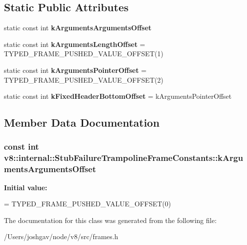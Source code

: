 \subsection*{Static Public Attributes}
\begin{DoxyCompactItemize}
\item 
static const int {\bfseries k\+Arguments\+Arguments\+Offset}
\item 
static const int {\bfseries k\+Arguments\+Length\+Offset} = T\+Y\+P\+E\+D\+\_\+\+F\+R\+A\+M\+E\+\_\+\+P\+U\+S\+H\+E\+D\+\_\+\+V\+A\+L\+U\+E\+\_\+\+O\+F\+F\+S\+ET(1)\hypertarget{classv8_1_1internal_1_1_stub_failure_trampoline_frame_constants_a8ff6afffeb210191e51c4a1f099601eb}{}\label{classv8_1_1internal_1_1_stub_failure_trampoline_frame_constants_a8ff6afffeb210191e51c4a1f099601eb}

\item 
static const int {\bfseries k\+Arguments\+Pointer\+Offset} = T\+Y\+P\+E\+D\+\_\+\+F\+R\+A\+M\+E\+\_\+\+P\+U\+S\+H\+E\+D\+\_\+\+V\+A\+L\+U\+E\+\_\+\+O\+F\+F\+S\+ET(2)\hypertarget{classv8_1_1internal_1_1_stub_failure_trampoline_frame_constants_a4a84da46fd7f1cb06a7f994f67da07d3}{}\label{classv8_1_1internal_1_1_stub_failure_trampoline_frame_constants_a4a84da46fd7f1cb06a7f994f67da07d3}

\item 
static const int {\bfseries k\+Fixed\+Header\+Bottom\+Offset} = k\+Arguments\+Pointer\+Offset\hypertarget{classv8_1_1internal_1_1_stub_failure_trampoline_frame_constants_a7ae9ee1715fc8c8cc52e0093fcd5f57e}{}\label{classv8_1_1internal_1_1_stub_failure_trampoline_frame_constants_a7ae9ee1715fc8c8cc52e0093fcd5f57e}

\end{DoxyCompactItemize}


\subsection{Member Data Documentation}
\subsubsection[{\texorpdfstring{k\+Arguments\+Arguments\+Offset}{kArgumentsArgumentsOffset}}]{\setlength{\rightskip}{0pt plus 5cm}const int v8\+::internal\+::\+Stub\+Failure\+Trampoline\+Frame\+Constants\+::k\+Arguments\+Arguments\+Offset\hspace{0.3cm}{\ttfamily [static]}}\hypertarget{classv8_1_1internal_1_1_stub_failure_trampoline_frame_constants_a8a582ea4a7bf2c1b3dec7d2d78ec9aa2}{}\label{classv8_1_1internal_1_1_stub_failure_trampoline_frame_constants_a8a582ea4a7bf2c1b3dec7d2d78ec9aa2}
{\bfseries Initial value\+:}
\begin{DoxyCode}
=
      TYPED\_FRAME\_PUSHED\_VALUE\_OFFSET(0)
\end{DoxyCode}


The documentation for this class was generated from the following file\+:\begin{DoxyCompactItemize}
\item 
/\+Users/joshgav/node/v8/src/frames.\+h\end{DoxyCompactItemize}
